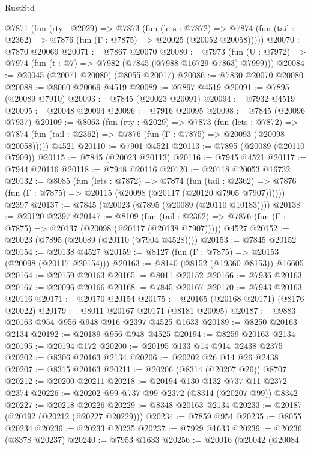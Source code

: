\begin{lexlean}{RustStd}
\begin{coremodule}
  @7871
    (fun (rty : @2029) =>
    @7873
      (fun (lets : @7872) =>
      @7874 (fun (tail : @2362) => @7876 (fun (Γ : @7875) => @20025 (@20052 @20058)))))
@20070 := @7870 @20069
@20071 := @7867 @20070
@20080 := @7973
    (fun (U : @7972) => @7974 (fun (t : @7) => @7982 (@7845 (@7988 @16729 @7863) @7999)))
@20084 := @20045 (@20071 @20080) (@8055 @20017)
@20086 := @7830 @20070 @20080
@20088 := @8060 @20069 @4519
@20089 := @7897 @4519
@20091 := @7895 (@20089 @7910)
@20093 := @7845 (@20023 @20091)
@20094 := @7932 @4519
@20095 := @20048 @20094
@20096 := @7916 @20095
@20098 := @7845 (@20096 @7937)
@20109 := @8063
    (fun (rty : @2029) =>
    @7873
      (fun (lets : @7872) =>
      @7874 (fun (tail : @2362) => @7876 (fun (Γ : @7875) => @20093 (@20098 @20058)))))
    @4521
@20110 := @7901 @4521
@20113 := @7895 (@20089 (@20110 @7909))
@20115 := @7845 (@20023 @20113)
@20116 := @7945 @4521
@20117 := @7944 @20116
@20118 := @7948 @20116
@20120 := @20118 @20053 @16732
@20132 := @8085
    (fun (lets : @7872) =>
    @7874
      (fun (tail : @2362) =>
      @7876 (fun (Γ : @7875) => @20115 (@20098 (@20117 (@20120 @7905 @7907))))))
    @2397
@20137 := @7845 (@20023 (@7895 (@20089 (@20110 @10183))))
@20138 := @20120 @2397
@20147 := @8109
    (fun (tail : @2362) => @7876 (fun (Γ : @7875) => @20137 (@20098 (@20117 (@20138 @7907)))))
    @4527
@20152 := @20023 (@7895 (@20089 (@20110 (@7904 @4528))))
@20153 := @7845 @20152
@20154 := @20138 @4527
@20159 := @8127 (fun (Γ : @7875) => @20153 (@20098 (@20117 @20154)))
@20163 := @8140 (@8152 (@19360 @8153)) @16605
@20164 := @20159 @20163
@20165 := @8011 @20152
@20166 := @7936 @20163
@20167 := @20096 @20166
@20168 := @7845 @20167
@20170 := @7943 @20163 @20116
@20171 := @20170 @20154
@20175 := @20165 (@20168 @20171) (@8176 @20022)
@20179 := @8011 @20167 @20171 (@8181 @20095)
@20187 := @9883 @20163 @954 @956 @948 @916 @2397 @4525 @1633
@20189 := @8250 @20163 @2134
@20192 := @20189 @956 @948 @4525
@20194 := @8259 @20163 @2134
@20195 := @20194 @172
@20200 := @20195 @133 @14 @914 @2438 @2375
@20202 := @8306 @20163 @2134
@20206 := @20202 @26 @14 @26 @2438
@20207 := @8315 @20163
@20211 := @20206 (@8314 (@20207 @26)) @8707
@20212 := @20200 @20211
@20218 := @20194 @130 @132 @737 @11 @2372 @2374
@20226 := @20202 @99 @737 @99 @2372 (@8314 (@20207 @99)) @8342
@20227 := @20218 @20226
@20229 := @8348 @20163 @2134
@20233 := @20187 (@20192 (@20212 (@20227 @20229)))
@20234 := @7859 @954
@20235 := @8055 @20234
@20236 := @20233 @20235
@20237 := @7929 @1633
@20239 := @20236 (@8378 @20237)
@20240 := @7953 @1633
@20256 := @20016
    (@20042
      (@20084

\end{coremodule}
\end{lexlean}
